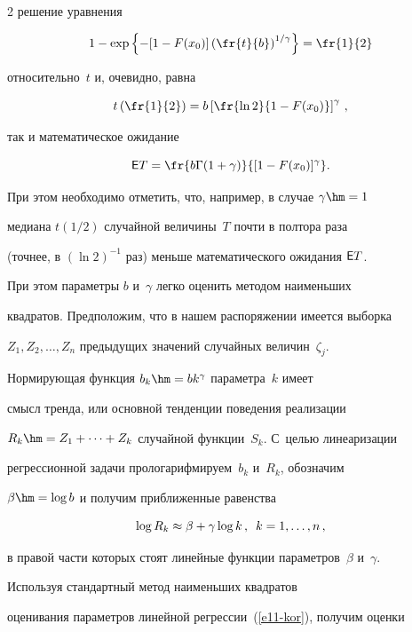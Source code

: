 \begin{multicols}{2}
решение уравнения


$$


1-\exp\left\{-[1-F(x_0)]\left(\fr{t}{b}\right)^{1/\gamma}\right\}=\fr{1}{2}


$$


относительно~$t$ и, очевидно, равна


$$


t\left(\fr{1}{2}\right)=b\left[\fr{\ln 2}{1-F(x_0)}\right]^{\gamma}\,,


$$


так и математическое ожидание


$$


{\sf E}T=\fr{b\Gamma(1+\gamma)}{[1-F(x_0)]^{\gamma}}.


$$


При этом необходимо отметить, что, например, в случае $\gamma\hm=1$


медиана $t(1/2)$ случайной величины~$T$ почти в полтора раза


(точнее, в $(\ln 2)^{-1}$ раз) меньше математического ожидания ${\sf E}T$.





При этом параметры $b$ и~$\gamma$ легко оценить методом наименьших


квадратов. Предположим, что в нашем распоряжении имеется выборка


$Z_1,Z_2,\ldots,Z_n$ предыду\-щих значений случайных величин~$\zeta_j$. 


Нормирующая функция $b_k\hm=bk^{\gamma}$ параметра~$k$ имеет


смысл тренда, или основной тенденции поведения реализации


$R_k\hm=Z_1+\cdots+Z_k$ случайной функции~$S_k$. С~целью линеаризации


регрессионной задачи прологарифмируем~$b_k$ и~$R_k$, обозначим


$\beta\hm=\log b$ и получим приближенные равенства


\begin{equation}


\log R_k\approx\beta+\gamma\log k\,,\enskip k=1,\ldots,n\,,\label{e11-kor}


\end{equation}


в правой части которых стоят линейные функции параметров~$\beta$ и~$\gamma$. 


Используя стандартный метод наименьших квадратов


оценивания параметров линейной регрессии~(\ref{e11-kor}), получим оценки



\end{multicols}
